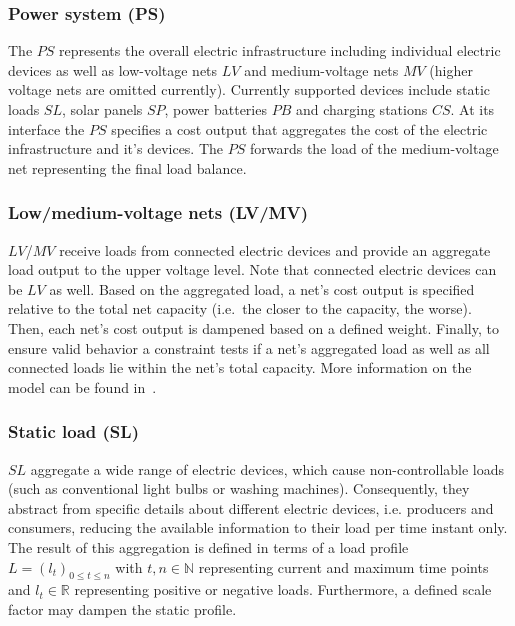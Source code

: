 \subsubsection*{Power system (PS)}

The $PS$ represents the overall electric infrastructure including individual electric devices as well as low-voltage nets $LV$ and medium-voltage nets $MV$ (higher voltage nets are omitted currently). Currently supported devices include static loads $SL$, solar panels $SP$, power batteries $PB$ and charging stations $CS$. At its interface the $PS$ specifies a cost output that aggregates the cost of the electric infrastructure and it's devices.
The $PS$ forwards the load of the medium-voltage net representing the final load balance.

\subsubsection*{Low/medium-voltage nets (LV/MV)}

$LV$/$MV$ receive loads from connected electric devices and provide an aggregate load output to the upper voltage level. Note that connected electric devices can be $LV$ as well. 
Based on the aggregated load, a net's cost output is specified relative to the total net capacity (i.e.\ the closer to the capacity, the worse). Then, each net's cost output is dampened based on a defined weight. Finally, to ensure valid behavior a constraint tests if a net's aggregated load as well as all connected loads lie within the net's total capacity. More information on the model can be found in~\cite{hackenberg2012applying}.

\subsubsection*{Static load (SL)}

$SL$ aggregate a wide range of electric devices, which cause non-controllable loads (such as conventional light bulbs or washing machines). Consequently, they abstract from specific details about different electric devices, i.e. producers and consumers, reducing the available information to their load per time instant only. The result of this aggregation is defined in terms of a load profile $L = (l_t)_{0 \leq t \leq n}$ with $t,n \in \mathbb{N}$ representing current and maximum time points and $l_t \in \mathbb{R}$ representing positive or negative loads.
Furthermore, a defined scale factor may dampen the static profile. 

